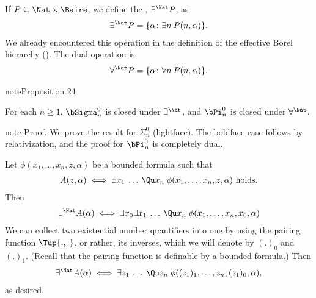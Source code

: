 \documentclass[letterpaper,10pt,english]{jupyterBook}
\begin{document}
\sphinxAtStartPar
If \(P \subseteq \Nat \times \Baire\), we define the , \(\exists^\Nat P\), as
\begin{equation*}
\begin{split}
	\exists^\Nat P = \{ \alpha \colon \exists n \: P(n,\alpha)\}.
\end{split}
\end{equation*}
\sphinxAtStartPar
We already encountered this operation in the definition of the effective Borel hierarchy ({\hyperref[\detokenize{codingBorel:def-effective-Borel}]{}}). The dual operation is
\begin{equation*}
\begin{split}
	\forall^\Nat P = \{ \alpha \colon \forall n \: P(n,\alpha)\}.
\end{split}
\end{equation*}\label{structureBorel:proposition-0}
\begin{sphinxadmonition}{note}{Proposition 24}



\sphinxAtStartPar
For each \(n \geq 1\), \(\bSigma^0_n\) is closed under \(\exists^\Nat\), and \(\bPi^0_n\) is closed under \(\forall^\Nat\).
\end{sphinxadmonition}

\begin{sphinxadmonition}{note}
\sphinxAtStartPar
Proof. We prove the result for \(\Sigma^0_n\) (lightface). The boldface case follows by relativization, and the proof for \(\bPi^0_n\) is completely dual.

\sphinxAtStartPar
Let \(\phi(x_1, \dots, x_n, z, \alpha)\) be a bounded formula such that
\begin{equation*}
\begin{split}
    A(z,\alpha) \iff \exists x_1 \: \dots \: \Qu x_n \; \phi(x_1, \dots, x_n, z, \alpha) \text{ holds}.
\end{split}
\end{equation*}
\sphinxAtStartPar
Then
\begin{equation*}
\begin{split}
    \exists^\Nat A(\alpha) \iff \exists x_0 \exists x_1 \: \dots \: \Qu x_n \; \phi(x_1, \dots, x_n, x_0,\alpha)
\end{split}
\end{equation*}
\sphinxAtStartPar
We can collect two existential number quantifiers into one by using the pairing function \(\Tup{.,.}\), or rather, its inverses, which we will denote by \((.)_0\) and \((.)_1\). (Recall that the pairing function is definable by a bounded formula.)
Then
\begin{equation*}
\begin{split}
    \exists^\Nat A(\alpha) \iff \exists z_1  \: \dots \: \Qu z_n \; \phi((z_1)_1, \dots, z_n, (z_1)_0,\alpha),
\end{split}
\end{equation*}
\sphinxAtStartPar
as desired.
\end{sphinxadmonition}
\end{document}
